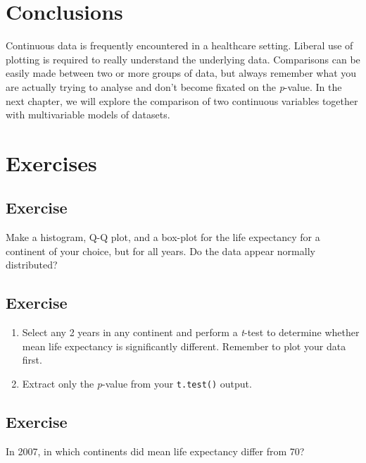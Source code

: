 \documentclass[
  12pt,
  krantz2]{krantz}
\begin{document}
\hypertarget{conclusions}{%
\section{Conclusions}\label{conclusions}}

Continuous data is frequently encountered in a healthcare setting.
Liberal use of plotting is required to really understand the underlying data.
Comparisons can be easily made between two or more groups of data, but always remember what you are actually trying to analyse and don't become fixated on the \emph{p}-value.
In the next chapter, we will explore the comparison of two continuous variables together with multivariable models of datasets.

\hypertarget{exercises-1}{%
\section{Exercises}\label{exercises-1}}

\hypertarget{chap06-ex1}{%
\subsection{Exercise}\label{chap06-ex1}}

Make a histogram, Q-Q plot, and a box-plot for the life expectancy for a continent of your choice, but for all years.
Do the data appear normally distributed?

\hypertarget{chap06-ex2}{%
\subsection{Exercise}\label{chap06-ex2}}

\begin{enumerate}
\def\labelenumi{\arabic{enumi}.}
\item
  Select any 2 years in any continent and perform a \emph{t}-test to determine whether mean life expectancy is significantly different.
  Remember to plot your data first.
\item
  Extract only the \emph{p}-value from your \texttt{t.test()} output.
\end{enumerate}

\hypertarget{chap06-ex3}{%
\subsection{Exercise}\label{chap06-ex3}}

In 2007, in which continents did mean life expectancy differ from 70?
\end{document}

